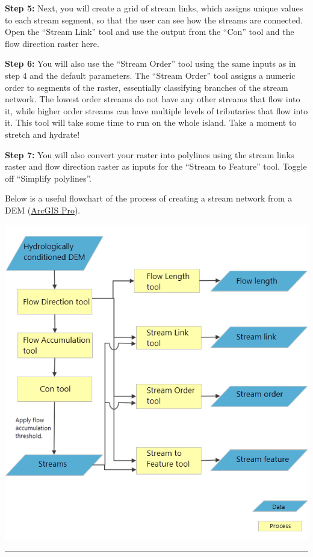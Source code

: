 \documentclass[
]{book}
\begin{document}
\textbf{Step 5:} Next, you will create a grid of stream links, which assigns unique values to each stream segment, so that the user can see how the streams are connected. Open the ``Stream Link'' tool and use the output from the ``Con'' tool and the flow direction raster here.

\textbf{Step 6:} You will also use the ``Stream Order'' tool using the same inputs as in step 4 and the default parameters. The ``Stream Order'' tool assigns a numeric order to segments of the raster, essentially classifying branches of the stream network. The lowest order streams do not have any other streams that flow into it, while higher order streams can have multiple levels of tributaries that flow into it. This tool will take some time to run on the whole island. Take a moment to stretch and hydrate!

\textbf{Step 7:} You will also convert your raster into polylines using the stream links raster and flow direction raster as inputs for the ``Stream to Feature'' tool. Toggle off ``Simplify polylines''.

Below is a useful flowchart of the process of creating a stream network from a DEM (\href{https://pro.arcgis.com/en/pro-app/tool-reference/spatial-analyst/deriving-runoff-characteristics.htm}{ArcGIS Pro}).

\includegraphics[width=0.75\linewidth]{images/02-flow-chart}

\begin{center}\rule{0.5\linewidth}{0.5pt}\end{center}
\end{document}
